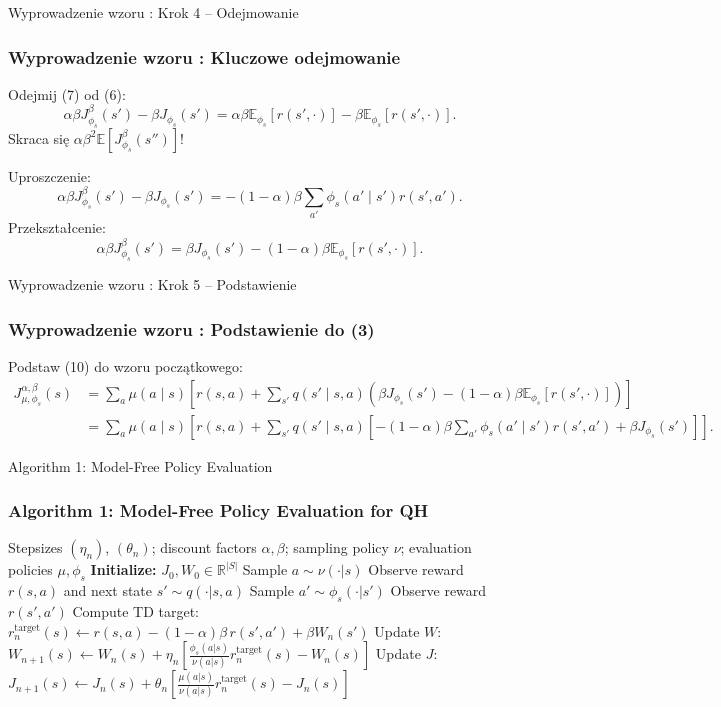 \begin{frame}{Wyprowadzenie wzoru : Krok 4 -- Odejmowanie}
\frametitle{Wyprowadzenie wzoru : Kluczowe odejmowanie}
Odejmij (7) od (6):
\begin{equation}
\alpha \beta J^{\beta}_{\phi_s}(s') - \beta J_{\phi_s}(s') = \alpha \beta \mathbb{E}_{\phi_s} [r(s', \cdot)] - \beta \mathbb{E}_{\phi_s} [r(s', \cdot)].
\end{equation}
Skraca się $\alpha \beta^2 \mathbb{E}[J^{\beta}_{\phi_s}(s'')]$!

Uproszczenie:
\begin{equation}
\alpha \beta J^{\beta}_{\phi_s}(s') - \beta J_{\phi_s}(s') = - (1 - \alpha) \beta \sum_{a'} \phi_s(a'\mid s') r(s', a').
\end{equation}
Przekształcenie:
\begin{equation}
\alpha \beta J^{\beta}_{\phi_s}(s') = \beta J_{\phi_s}(s') - (1 - \alpha) \beta \mathbb{E}_{\phi_s} [r(s', \cdot)].
\end{equation}
\end{frame}

\begin{frame}{Wyprowadzenie wzoru : Krok 5 -- Podstawienie}
\frametitle{Wyprowadzenie wzoru : Podstawienie do (3)}
Podstaw (10) do wzoru początkowego:
\begin{align}
J^{\alpha, \beta}_{\mu, \phi_s}(s) &= \sum_a \mu(a\mid s) \left[ r(s, a) + \sum_{s'} q(s'\mid s, a) \left( \beta J_{\phi_s}(s') - (1 - \alpha) \beta \mathbb{E}_{\phi_s} [r(s', \cdot)] \right) \right] \\
&= \sum_a \mu(a\mid s) \left[ r(s, a) + \sum_{s'} q(s'\mid s, a) \left[ -(1 - \alpha)\beta \sum_{a'} \phi_s(a'\mid s') r(s', a') + \beta J_{\phi_s}(s') \right] \right].
\end{align}
\end{frame}

\begin{frame}[fragile]{Algorithm 1: Model-Free Policy Evaluation}
\frametitle{Algorithm 1: Model-Free Policy Evaluation for QH}
\begin{algorithm}[H]
\caption{Model-Free Policy Evaluation for QH Discounting}
\begin{algorithmic}[1]
\REQUIRE Stepsizes $(\eta_n)$, $(\theta_n)$; discount factors $\alpha, \beta$; sampling policy $\nu$; evaluation policies $\mu, \phi_s$
\STATE \textbf{Initialize:} $J_0, W_0 \in \mathbb{R}^{|S|}$
\STATE Sample $a \sim \nu(\cdot|s)$
\STATE Observe reward $r(s, a)$ and next state $s' \sim q(\cdot|s, a)$
\STATE Sample $a' \sim \phi_s(\cdot|s')$
\STATE Observe reward $r(s', a')$
\STATE Compute TD target: $r^{\text{target}}_n(s) \leftarrow r(s, a) - (1 - \alpha)\beta \, r(s', a') + \beta W_n(s')$
\STATE Update $W$: $W_{n+1}(s) \leftarrow W_n(s) + \eta_n \left[ \frac{\phi_s(a|s)}{\nu(a|s)} r^{\text{target}}_n(s) - W_n(s) \right]$
\STATE Update $J$: $J_{n+1}(s) \leftarrow J_n(s) + \theta_n \left[ \frac{\mu(a|s)}{\nu(a|s)} r^{\text{target}}_n(s) - J_n(s) \right]$
\ENDFOR
\ENDFOR
\end{algorithmic}
\end{algorithm}
\end{frame}

